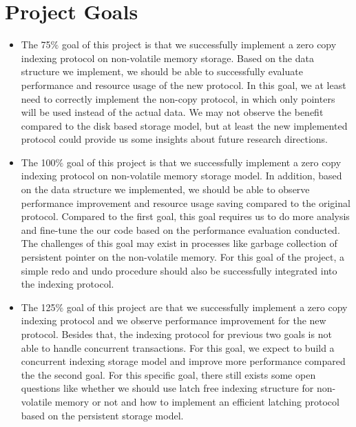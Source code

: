 \section{Project Goals}
\begin{itemize}
    \item The 75$\%$ goal of this project is that we successfully implement a zero copy indexing protocol on non-volatile memory storage. Based on the data structure we implement, we should be able to successfully evaluate performance and resource usage of the new protocol. In this goal, we at least need to correctly implement the non-copy protocol, in which only pointers will be used instead of the actual data. We may not observe the benefit compared to the disk based storage model, but at least the new implemented protocol could provide us some insights about future research directions.
    \item The 100$\%$ goal of this project is that we successfully implement a zero copy indexing protocol on non-volatile memory storage model. In addition, based on the data structure we implemented, we should be able to observe performance improvement and resource usage saving compared to the original protocol. Compared to the first goal, this goal requires us to do more analysis and fine-tune the our code based on the performance evaluation conducted. The challenges of this goal may exist in processes like garbage collection of persistent pointer on the non-volatile memory. For this goal of the project, a simple redo and undo procedure should also be successfully integrated into the indexing protocol.
    \item The 125$\%$ goal of this project are that we successfully implement a zero copy indexing protocol and we observe performance improvement for the new protocol. Besides that, the indexing protocol for previous two goals is not able to handle concurrent transactions. For this goal, we expect to build a concurrent indexing storage model and improve more performance compared the the second goal. For this specific goal, there still exists some open questions like whether we should use latch free indexing structure for non-volatile memory or not and how to implement an efficient latching protocol based on the persistent storage model.
\end{itemize}

